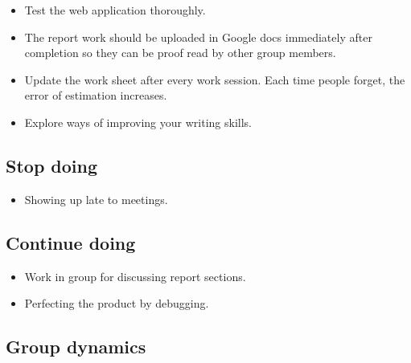 \begin{itemize}
  \item Test the web application thoroughly.
  \item The report work should be uploaded in Google docs immediately after completion so they can be proof read by other group members.
  \item Update the work sheet after every work session. Each time people forget, the error of estimation increases. 
  \item Explore ways of improving your writing skills. 
\end{itemize}

\subsection{Stop doing}
\label{subsec:S5RetrospectiveStop}
\begin{itemize}
\item Showing up late to meetings. 
\end{itemize}

\subsection{Continue doing}
\label{subsec:S5RetrospectiveContinue}

\begin{itemize}
  \item Work in group for discussing report sections.
  \item Perfecting the product by debugging. 
\end{itemize}

\subsection{Group dynamics}
\label{subsec:S5RetrospectiveDynamics}




